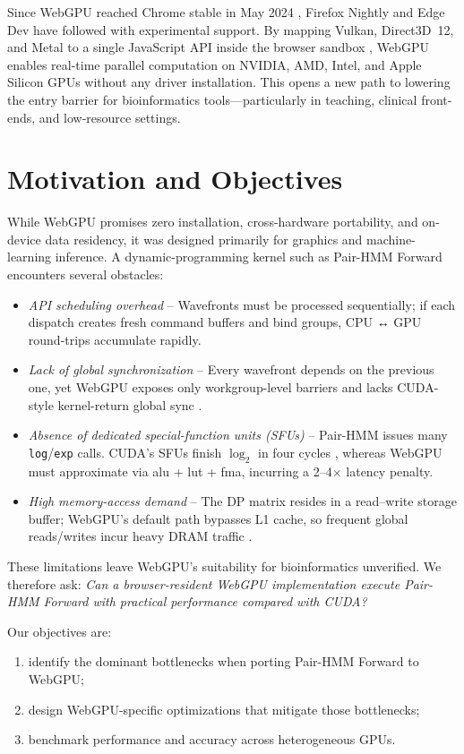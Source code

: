 \documentclass[PhD]{PHlab-thesis}
\begin{document}
Since WebGPU reached Chrome stable in May 2024 \cite{Chrome2024-blog}, Firefox Nightly and Edge Dev have followed with experimental support. By mapping Vulkan, Direct3D~12, and Metal to a single JavaScript API inside the browser sandbox \cite{W3C2024-webgpu}, WebGPU enables real-time parallel computation on NVIDIA, AMD, Intel, and Apple Silicon GPUs without any driver installation. This opens a new path to lowering the entry barrier for bioinformatics tools—particularly in teaching, clinical front-ends, and low-resource settings.

\section{Motivation and Objectives}
While WebGPU promises zero installation, cross-hardware portability, and on-device data residency, it was designed primarily for graphics and machine-learning inference. A dynamic-programming kernel such as Pair-HMM Forward encounters several obstacles:

\begin{itemize}
  \item \textit{API scheduling overhead} – Wavefronts must be processed sequentially; if each dispatch creates fresh command buffers and bind groups, CPU ↔ GPU round-trips accumulate rapidly.
  \item \textit{Lack of global synchronization} – Every wavefront depends on the previous one, yet WebGPU exposes only workgroup-level barriers and lacks CUDA-style kernel-return global sync \cite{W3C2024-webgpu}.
  \item \textit{Absence of dedicated special-function units (SFUs)} – Pair-HMM issues many \verb|log|/\verb|exp| calls. CUDA's SFUs finish $\log_{2}$ in four cycles \cite{NVIDIA2023-cudaguide}, whereas WebGPU must approximate via alu + lut + fma, incurring a 2–4$\times$ latency penalty.
  \item \textit{High memory-access demand} – The DP matrix resides in a read–write storage buffer; WebGPU's default path bypasses L1 cache, so frequent global reads/writes incur heavy DRAM traffic \cite{Liu2021-bib}.
\end{itemize}

These limitations leave WebGPU's suitability for bioinformatics unverified. We therefore ask: \textit{Can a browser-resident WebGPU implementation execute Pair-HMM Forward with practical performance compared with CUDA?}

Our objectives are:
\begin{enumerate}
  \item identify the dominant bottlenecks when porting Pair-HMM Forward to WebGPU;
  \item design WebGPU-specific optimizations that mitigate those bottlenecks;
  \item benchmark performance and accuracy across heterogeneous GPUs.
\end{enumerate}
\end{document}
